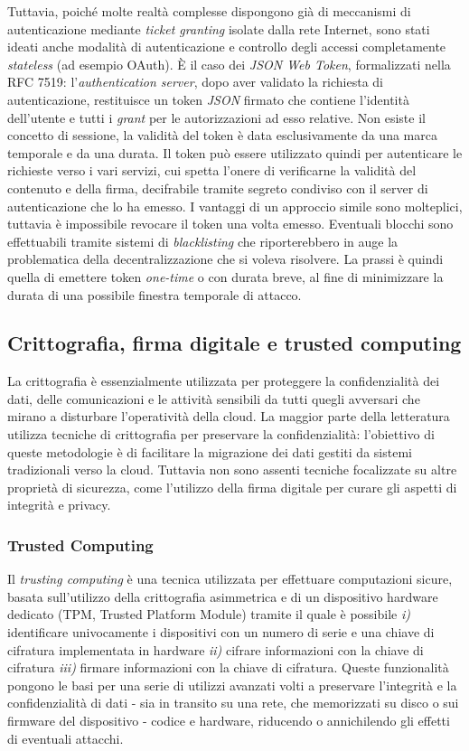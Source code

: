 \documentclass[../main.tex]{subfiles}
\begin{document}
Tuttavia, poiché molte realtà complesse dispongono già di meccanismi di autenticazione mediante \textit{ticket granting} isolate dalla rete Internet, sono stati ideati anche modalità di autenticazione e controllo degli accessi completamente \textit{stateless} (ad esempio OAuth).
È il caso dei \textit{JSON Web Token}, formalizzati nella RFC 7519: l'\textit{authentication server}, dopo aver validato la richiesta di autenticazione, restituisce un token \textit{JSON} firmato che contiene l'identità dell'utente e tutti i \textit{grant} per le autorizzazioni ad esso relative.
Non esiste il concetto di sessione, la validità del token è data esclusivamente da una marca temporale e da una durata. Il token può essere utilizzato quindi per autenticare le richieste verso i vari servizi, cui spetta l'onere di verificarne la validità del contenuto e della firma, decifrabile tramite segreto condiviso con il server di autenticazione che lo ha emesso.
I vantaggi di un approccio simile sono molteplici, tuttavia è impossibile revocare il token una volta emesso. Eventuali blocchi sono effettuabili tramite sistemi di \textit{blacklisting} che riporterebbero in auge la problematica della decentralizzazione che si voleva risolvere. La prassi è quindi quella di emettere token \textit{one-time} o con durata breve, al fine di minimizzare la durata di una possibile finestra temporale di attacco.

\subsection{Crittografia, firma digitale e trusted computing}
La crittografia è essenzialmente utilizzata per proteggere la confidenzialità dei dati, delle comunicazioni e le attività sensibili da tutti quegli avversari che mirano a disturbare l'operatività della cloud.
La maggior parte della letteratura utilizza tecniche di crittografia per preservare la confidenzialità: l'obiettivo di queste metodologie è di facilitare la migrazione dei dati gestiti da sistemi tradizionali verso la cloud.
Tuttavia non sono assenti tecniche focalizzate su altre proprietà di sicurezza, come l'utilizzo della firma digitale per curare gli aspetti di integrità e privacy.

\subsubsection{Trusted Computing}
Il \textit{trusting computing} è una tecnica utilizzata per effettuare computazioni sicure, basata sull'utilizzo della crittografia asimmetrica e di un dispositivo hardware dedicato (TPM, Trusted Platform Module) tramite il quale è possibile \textit{i)} identificare univocamente i dispositivi con un numero di serie e una chiave di cifratura implementata in hardware \textit{ii)} cifrare informazioni con la chiave di cifratura \textit{iii)} firmare informazioni con la chiave di cifratura.
Queste funzionalità pongono le basi per una serie di utilizzi avanzati volti a preservare l'integrità e la confidenzialità di dati - sia in transito su una rete, che memorizzati su disco o sui firmware del dispositivo - codice e hardware, riducendo o annichilendo gli effetti di eventuali attacchi.
\end{document}
